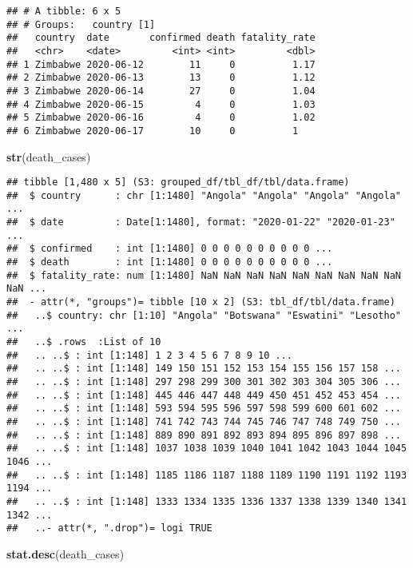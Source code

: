\documentclass[
]{article}
\newenvironment{Shaded}{\begin{snugshade}}{\end{snugshade}}
\newcommand{\KeywordTok}[1]{\textcolor[rgb]{0.13,0.29,0.53}{\textbf{#1}}}
\newcommand{\NormalTok}[1]{#1}
\begin{document}
\begin{verbatim}
## # A tibble: 6 x 5
## # Groups:   country [1]
##   country  date       confirmed death fatality_rate
##   <chr>    <date>         <int> <int>         <dbl>
## 1 Zimbabwe 2020-06-12        11     0          1.17
## 2 Zimbabwe 2020-06-13        13     0          1.12
## 3 Zimbabwe 2020-06-14        27     0          1.04
## 4 Zimbabwe 2020-06-15         4     0          1.03
## 5 Zimbabwe 2020-06-16         4     0          1.02
## 6 Zimbabwe 2020-06-17        10     0          1
\end{verbatim}

\begin{Shaded}
\begin{Highlighting}[]
\KeywordTok{str}\NormalTok{(death_cases)}
\end{Highlighting}
\end{Shaded}

\begin{verbatim}
## tibble [1,480 x 5] (S3: grouped_df/tbl_df/tbl/data.frame)
##  $ country      : chr [1:1480] "Angola" "Angola" "Angola" "Angola" ...
##  $ date         : Date[1:1480], format: "2020-01-22" "2020-01-23" ...
##  $ confirmed    : int [1:1480] 0 0 0 0 0 0 0 0 0 0 ...
##  $ death        : int [1:1480] 0 0 0 0 0 0 0 0 0 0 ...
##  $ fatality_rate: num [1:1480] NaN NaN NaN NaN NaN NaN NaN NaN NaN NaN ...
##  - attr(*, "groups")= tibble [10 x 2] (S3: tbl_df/tbl/data.frame)
##   ..$ country: chr [1:10] "Angola" "Botswana" "Eswatini" "Lesotho" ...
##   ..$ .rows  :List of 10
##   .. ..$ : int [1:148] 1 2 3 4 5 6 7 8 9 10 ...
##   .. ..$ : int [1:148] 149 150 151 152 153 154 155 156 157 158 ...
##   .. ..$ : int [1:148] 297 298 299 300 301 302 303 304 305 306 ...
##   .. ..$ : int [1:148] 445 446 447 448 449 450 451 452 453 454 ...
##   .. ..$ : int [1:148] 593 594 595 596 597 598 599 600 601 602 ...
##   .. ..$ : int [1:148] 741 742 743 744 745 746 747 748 749 750 ...
##   .. ..$ : int [1:148] 889 890 891 892 893 894 895 896 897 898 ...
##   .. ..$ : int [1:148] 1037 1038 1039 1040 1041 1042 1043 1044 1045 1046 ...
##   .. ..$ : int [1:148] 1185 1186 1187 1188 1189 1190 1191 1192 1193 1194 ...
##   .. ..$ : int [1:148] 1333 1334 1335 1336 1337 1338 1339 1340 1341 1342 ...
##   ..- attr(*, ".drop")= logi TRUE
\end{verbatim}

\begin{Shaded}
\begin{Highlighting}[]
\KeywordTok{stat.desc}\NormalTok{(death_cases)}
\end{Highlighting}
\end{Shaded}
\end{document}
